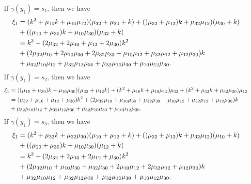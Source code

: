 \documentclass[11pt]{article}
\theoremstyle{definition}
\begin{document}
If $\gamma(y_1)=s_1$, then we have
\begin{align}
    \xi_1&=(k^2+\mu_{10}k+\mu_{10}\mu_{12})(\mu_{32}+\mu_{30}+k)+((\mu_{32}+\mu_{12})k+\mu_{32}\mu_{12})(\mu_{30}+k)\notag\\&+((\mu_{10}+\mu_{30})k+\mu_{10}\mu_{30})(\mu_{32}+k)\notag\\
    &=k^3+(2\mu_{32}+2\mu_{10}+\mu_{12}+2\mu_{30})k^2\notag\\
    &+(2\mu_{32}\mu_{10}+2\mu_{10}\mu_{30}+2\mu_{32}\mu_{30}+\mu_{10}\mu_{12}+\mu_{32}\mu_{12}+\mu_{12}\mu_{30})k\notag\\
    &+\mu_{32}\mu_{10}\mu_{12}+\mu_{32}\mu_{12}\mu_{30}+\mu_{32}\mu_{10}\mu_{30}+\mu_{10}\mu_{12}\mu_{30}.
\end{align}
If $\gamma(y_1)=s_2$, then we have
\begin{align}
    \xi_1&=((\mu_{10}+\mu_{30})k+\mu_{10}\mu_{30})(\mu_{32}+\mu_{12}k)+(k^2+\mu_{10}k+\mu_{10}\mu_{12})\mu_{32}+(k^2+\mu_{32}k+\mu_{32}\mu_{30})\mu_{12}\notag\\
    &=(\mu_{32}+\mu_{10}+\mu_{12}+\mu_{30})k^2+(2\mu_{32}\mu_{10}+\mu_{10}\mu_{30}+\mu_{32}\mu_{30}+\mu_{10}\mu_{12}+\mu_{32}\mu_{12}+\mu_{12}\mu_{30})k\notag\\
    &+\mu_{32}\mu_{10}\mu_{12}+\mu_{32}\mu_{12}\mu_{30}+\mu_{32}\mu_{10}\mu_{30}+\mu_{10}\mu_{12}\mu_{30}.
\end{align}
If $\gamma(y_1)=s_3$, then we have
\begin{align}
    \xi_1&=(k^2+\mu_{32}k+\mu_{32}\mu_{30})(\mu_{10}+\mu_{12}+k)+((\mu_{32}+\mu_{12})k+\mu_{32}\mu_{12})(\mu_{10}+k)\notag\\&+((\mu_{10}+\mu_{30})k+\mu_{10}\mu_{30})(\mu_{12}+k)\notag\\
    &=k^3+(2\mu_{32}+2\mu_{10}+2\mu_{12}+\mu_{30})k^2\notag\\
    &+(2\mu_{32}\mu_{10}+\mu_{10}\mu_{30}+\mu_{32}\mu_{30}+2\mu_{10}\mu_{12}+2\mu_{32}\mu_{12}+\mu_{12}\mu_{30})k\notag\\
    &+\mu_{32}\mu_{10}\mu_{12}+\mu_{32}\mu_{12}\mu_{30}+\mu_{32}\mu_{10}\mu_{30}+\mu_{10}\mu_{12}\mu_{30}.
\end{align}
\end{document}
